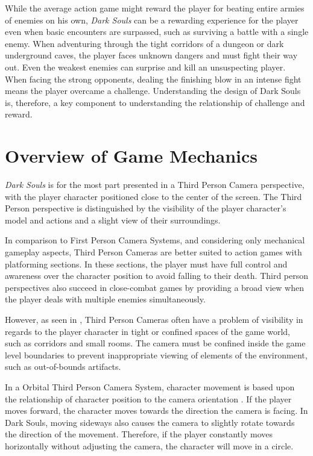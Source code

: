 While the average action game might reward the player for beating entire armies of enemies on his own, \emph{Dark Souls} can be a rewarding experience for the player even when basic encounters are surpassed, such as surviving a battle with a single enemy. When adventuring through the tight corridors of a dungeon or dark underground caves, the player faces unknown dangers and must fight their way out. Even the weakest enemies can surprise and kill an unsuspecting player. When facing the strong opponents, dealing the finishing blow in an intense fight means the player overcame a challenge. Understanding the design of Dark Souls is, therefore, a key component to understanding the relationship of challenge and reward.


\section{Overview of Game Mechanics}

\emph{Dark Souls} is for the most part presented in a Third Person Camera perspective, with the player character positioned close to the center of the screen. The Third Person perspective is distinguished by the visibility of the player character's model and actions and a slight view of their surroundings.

In comparison to First Person Camera Systems, and considering only mechanical gameplay aspects, Third Person Cameras are better suited to action games with platforming sections. In these sections, the player must have full control and awareness over the character position to avoid falling to their death. Third person perspectives also succeed in close-combat games by providing a broad view when the player deals with multiple enemies simultaneously.

However, as seen in \cite{BOOK_LevelUpTheGuideToGreat}, Third Person Cameras often have a problem of visibility in regards to the player character in tight or confined spaces of the game world, such as corridors and small rooms. The camera must be confined inside the game level boundaries to prevent inappropriate viewing of elements of the environment, such as  out-of-bounds artifacts.

In a Orbital Third Person Camera System, character movement is based upon the relationship of character position to the camera orientation \cite{BOOK_RealTimeCameras}. If the player moves forward, the character moves towards the direction the camera is facing. In Dark Souls, moving sideways also causes the camera to slightly rotate towards the direction of the movement. Therefore, if the player constantly moves horizontally without adjusting the camera, the character will move in a circle.

